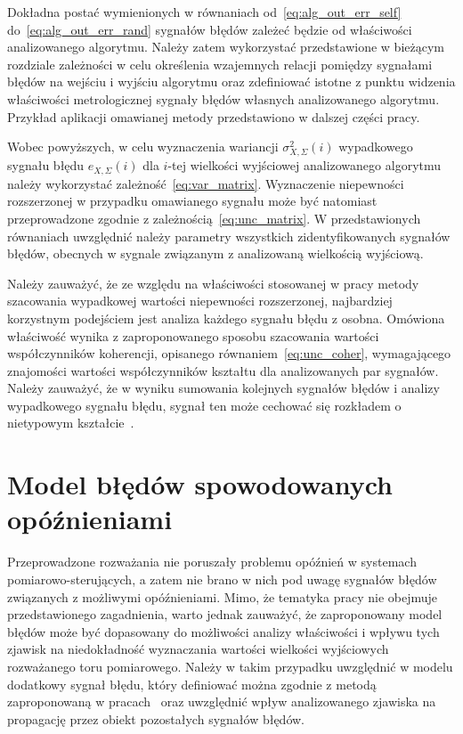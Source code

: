 Dokładna postać wymienionych w równaniach od~\eqref{eq:alg_out_err_self} do~\eqref{eq:alg_out_err_rand} sygnałów błędów zależeć będzie od właściwości analizowanego algorytmu. Należy zatem wykorzystać przedstawione w bieżącym rozdziale zależności w celu określenia wzajemnych relacji pomiędzy sygnałami błędów na wejściu i wyjściu algorytmu oraz zdefiniować istotne z punktu widzenia właściwości metrologicznej sygnały błędów własnych analizowanego algorytmu. Przykład aplikacji omawianej metody przedstawiono w dalszej części pracy.

Wobec powyższych, w celu wyznaczenia wariancji $\sigma_{X,\Sigma}^{2}(i)$ wypadkowego sygnału błędu $e_{X,\Sigma}(i)$ dla $i$-tej wielkości wyjściowej analizowanego algorytmu należy wykorzystać zależność~\eqref{eq:var_matrix}. Wyznaczenie niepewności rozszerzonej w przypadku omawianego sygnału może być natomiast przeprowadzone zgodnie z zależnością~\eqref{eq:unc_matrix}. W przedstawionych równaniach uwzględnić należy parametry wszystkich zidentyfikowanych sygnałów błędów, obecnych w sygnale związanym z analizowaną wielkością wyjściową.

Należy zauważyć, że ze względu na właściwości stosowanej w pracy metody szacowania wypadkowej wartości niepewności rozszerzonej, najbardziej korzystnym podejściem jest analiza każdego sygnału błędu z osobna. Omówiona właściwość wynika z zaproponowanego sposobu szacowania wartości współczynników koherencji, opisanego równaniem~\eqref{eq:unc_coher}, wymagającego znajomości wartości współczynników kształtu dla analizowanych par sygnałów. Należy zauważyć, że w wyniku sumowania kolejnych sygnałów błędów i analizy wypadkowego sygnału błędu, sygnał ten może cechować się rozkładem o nietypowym kształcie~\cite{auth_electronics, auth_model, zhang_pdp}.

\section{Model błędów spowodowanych opóźnieniami}

Przeprowadzone rozważania nie poruszały problemu opóźnień w systemach pomiarowo-sterujących, a zatem nie brano w nich pod uwagę sygnałów błędów związanych z możliwymi opóźnieniami. Mimo, że tematyka pracy nie obejmuje przedstawionego zagadnienia, warto jednak zauważyć, że zaproponowany model błędów może być dopasowany do możliwości analizy właściwości i wpływu tych zjawisk na niedokładność wyznaczania wartości wielkości wyjściowych rozważanego toru pomiarowego. Należy w takim przypadku uwzględnić w modelu dodatkowy sygnał błędu, który definiować można zgodnie z metodą zaproponowaną w pracach~\cite{wymyslo_delay, jakubiec_system} oraz uwzględnić wpływ analizowanego zjawiska na propagację przez obiekt pozostałych sygnałów błędów.


